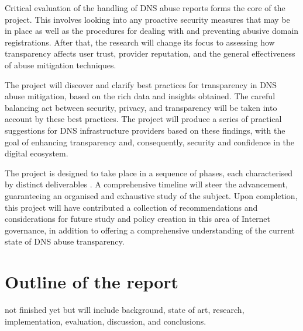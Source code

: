 Critical evaluation of the handling of DNS abuse reports forms the core of the project. This involves looking into any proactive security measures that may be in place as well as the procedures for dealing with and preventing abusive domain registrations. After that, the research will change its focus to assessing how transparency affects user trust, provider reputation, and the general effectiveness of abuse mitigation techniques.

The project will discover and clarify best practices for transparency in DNS abuse mitigation, based on the rich data and insights obtained. The careful balancing act between security, privacy, and transparency will be taken into account by these best practices. The project will produce a series of practical suggestions for DNS infrastructure providers based on these findings, with the goal of enhancing transparency and, consequently, security and confidence in the digital ecosystem.

The project is designed to take place in a sequence of phases, each characterised by distinct deliverables . A comprehensive timeline will steer the advancement, guaranteeing an organised and exhaustive study of the subject. Upon completion, this project will have contributed a collection of recommendations and considerations for future study and policy creation in this area of Internet governance, in addition to offering a comprehensive understanding of the current state of DNS abuse transparency.

\section{Outline of the report}
not finished yet but will include background, state of art, research, implementation, evaluation, discussion, and conclusions. 